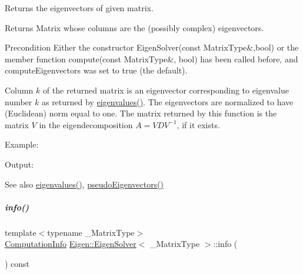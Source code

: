 Returns the eigenvectors of given matrix. 

\begin{DoxyReturn}{Returns}
Matrix whose columns are the (possibly complex) eigenvectors.
\end{DoxyReturn}
\begin{DoxyPrecond}{Precondition}
Either the constructor Eigen\+Solver(const Matrix\+Type\&,bool) or the member function compute(const Matrix\+Type\&, bool) has been called before, and {\ttfamily compute\+Eigenvectors} was set to true (the default).
\end{DoxyPrecond}
Column $ k $ of the returned matrix is an eigenvector corresponding to eigenvalue number $ k $ as returned by \hyperlink{group___eigenvalues___module_a114189009e42f5e03372a7a3dfa33b97}{eigenvalues()}. The eigenvectors are normalized to have (Euclidean) norm equal to one. The matrix returned by this function is the matrix $ V $ in the eigendecomposition $ A = V D V^{-1} $, if it exists.

Example\+: 
\begin{DoxyCodeInclude}
\end{DoxyCodeInclude}
 Output\+: 
\begin{DoxyVerbInclude}
\end{DoxyVerbInclude}


\begin{DoxySeeAlso}{See also}
\hyperlink{group___eigenvalues___module_a114189009e42f5e03372a7a3dfa33b97}{eigenvalues()}, \hyperlink{group___eigenvalues___module_a4e796226f06e1f7347cf03a38755a155}{pseudo\+Eigenvectors()} 
\end{DoxySeeAlso}
\mbox{\label{group___eigenvalues___module_ac4af54fadc33abcdd1778c87bfbf005b}} 
\subparagraph{\texorpdfstring{info()}{info()}\hspace{0.1cm}{\footnotesize\ttfamily [1/2]}}
{\footnotesize\ttfamily template$<$typename \+\_\+\+Matrix\+Type$>$ \\
\hyperlink{group__enums_ga85fad7b87587764e5cf6b513a9e0ee5e}{Computation\+Info} \hyperlink{group___eigenvalues___module_class_eigen_1_1_eigen_solver}{Eigen\+::\+Eigen\+Solver}$<$ \+\_\+\+Matrix\+Type $>$\+::info (\begin{DoxyParamCaption}{ }\end{DoxyParamCaption}) const\hspace{0.3cm}{\ttfamily [inline]}}

